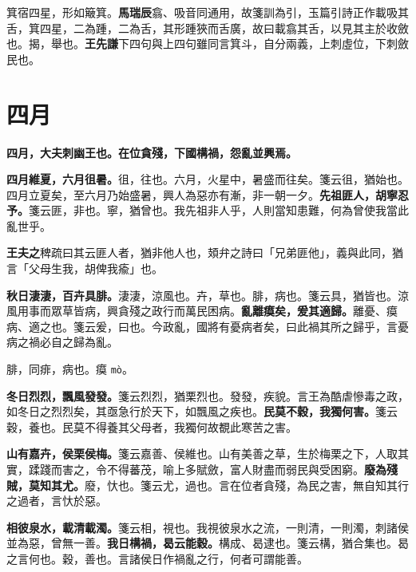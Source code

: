 \begin{quoting}箕宿四星，形如簸箕。\textbf{馬瑞辰}翕、吸音同通用，故箋訓為引，玉篇引詩正作載吸其舌，箕四星，二為踵，二為舌，其形踵狹而舌廣，故曰載翕其舌，以見其主於收斂也。揭，舉也。\textbf{王先謙}下四句與上四句雖同言箕斗，自分兩義，上刺虛位，下刺斂民也。\end{quoting}

\section{四月}


\textbf{四月，大夫刺幽王也。在位貪殘，下國構禍，怨亂並興焉。}

\textbf{四月維夏，六月徂暑。}{\footnotesize 徂，往也。六月，火星中，暑盛而往矣。箋云徂，猶始也。四月立夏矣，至六月乃始盛暑，興人為惡亦有漸，非一朝一夕。}\textbf{先祖匪人，胡寧忍予。}{\footnotesize 箋云匪，非也。寧，猶曾也。我先祖非人乎，人則當知患難，何為曾使我當此亂世乎。}

\begin{quoting}\textbf{王夫之}稗疏曰其云匪人者，猶非他人也，頍弁之詩曰「兄弟匪他」，義與此同，猶言「父母生我，胡俾我瘉」也。\end{quoting}

\textbf{秋日淒淒，百卉具腓。}{\footnotesize 淒淒，涼風也。卉，草也。腓，病也。箋云具，猶皆也。涼風用事而眾草皆病，興貪殘之政行而萬民困病。}\textbf{亂離瘼矣，爰其適歸。}{\footnotesize 離憂、瘼病、適之也。箋云爰，曰也。今政亂，國將有憂病者矣，曰此禍其所之歸乎，言憂病之禍必自之歸為亂。}

\begin{quoting}腓，同痱，病也。瘼 \texttt{mò}。\end{quoting}

\textbf{冬日烈烈，飄風發發。}{\footnotesize 箋云烈烈，猶栗烈也。發發，疾貌。言王為酷虐慘毒之政，如冬日之烈烈矣，其亟急行於天下，如飄風之疾也。}\textbf{民莫不穀，我獨何害。}{\footnotesize 箋云穀，養也。民莫不得養其父母者，我獨何故覩此寒苦之害。}

\textbf{山有嘉卉，侯栗侯梅。}{\footnotesize 箋云嘉善、侯維也。山有美善之草，生於梅栗之下，人取其實，蹂踐而害之，令不得蕃茂，喻上多賦斂，富人財盡而弱民與受困窮。}\textbf{廢為殘賊，莫知其尤。}{\footnotesize 廢，忕也。箋云尤，過也。言在位者貪殘，為民之害，無自知其行之過者，言忕於惡。}

\textbf{相彼泉水，載清載濁。}{\footnotesize 箋云相，視也。我視彼泉水之流，一則清，一則濁，刺諸侯並為惡，曾無一善。}\textbf{我日構禍，曷云能穀。}{\footnotesize 構成、曷逮也。箋云構，猶合集也。曷之言何也。穀，善也。言諸侯日作禍亂之行，何者可謂能善。}

